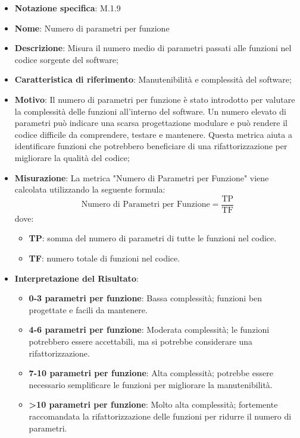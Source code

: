 \begin{itemize}
    \item \textbf{Notazione specifica}: M.1.9
    \item \textbf{Nome}: Numero di parametri per funzione
    \item \textbf{Descrizione}: Misura il numero medio di parametri passati alle funzioni nel codice sorgente del software;
    \item \textbf{Caratteristica di riferimento}: Manutenibilità e complessità del software;
    \item \textbf{Motivo}: Il numero di parametri per funzione è stato introdotto per valutare la complessità delle funzioni all'interno del software. Un numero elevato di parametri può indicare una scarsa progettazione modulare e può rendere il codice difficile da comprendere, testare e mantenere. Questa metrica aiuta a identificare funzioni che potrebbero beneficiare di una rifattorizzazione per migliorare la qualità del codice;
    \item \textbf{Misurazione}: La metrica "Numero di Parametri per Funzione" viene calcolata utilizzando la seguente formula:
    \[
    \text{Numero di Parametri per Funzione} = \frac{\text{TP}}{\text{TF}}
    \]
    dove:
    \begin{itemize}
        \item \textbf{TP}: somma del numero di parametri di tutte le funzioni nel codice.
        \item \textbf{TF}: numero totale di funzioni nel codice.
    \end{itemize}
    \item \textbf{Interpretazione del Risultato}:
    \begin{itemize}
        \item \textbf{0-3 parametri per funzione}: Bassa complessità; funzioni ben progettate e facili da mantenere.
        \item \textbf{4-6 parametri per funzione}: Moderata complessità; le funzioni potrebbero essere accettabili, ma si potrebbe considerare una rifattorizzazione.
        \item \textbf{7-10 parametri per funzione}: Alta complessità; potrebbe essere necessario semplificare le funzioni per migliorare la manutenibilità.
        \item \textbf{>10 parametri per funzione}: Molto alta complessità; fortemente raccomandata la rifattorizzazione delle funzioni per ridurre il numero di parametri.
    \end{itemize}
\end{itemize}
